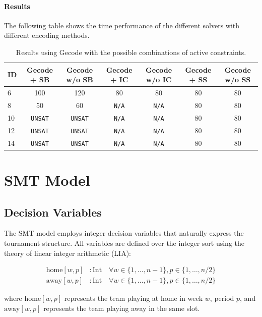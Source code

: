 \documentclass[11pt]{article}
\begin{document}
\paragraph{Results} The following table shows the time performance of the different solvers with different encoding methods.
\begin{table}[H]
\centering
\small
\label{tab:sat}
\begin{tabular}{@{}lcccccc@{}}
\toprule
ID & Gecode + SB & Gecode w/o SB & Gecode + IC & Gecode w/o IC & Gecode + SS & Gecode w/o SS \\
\midrule
6 & 100 & 120 & 80 & 80 & 80 & 80\\
8 & 50 & 60 & \texttt{N/A} & \texttt{N/A} & 80 & 80 \\
10 & \texttt{UNSAT} & \texttt{UNSAT} & \texttt{N/A} & \texttt{N/A} & 80 & 80\\
12 & \texttt{UNSAT} & \texttt{UNSAT} & \texttt{N/A} & \texttt{N/A} & 80 & 80\\
14 & \texttt{UNSAT} & \texttt{UNSAT} & \texttt{N/A} & \texttt{N/A} & 80 & 80\\
\bottomrule
\end{tabular}
\caption{Results using Gecode with the possible combinations of active constraints.}
\end{table}

\section{SMT Model}

\subsection{Decision Variables}

The SMT model employs integer decision variables that naturally express the tournament structure. All variables are defined over the integer sort using the theory of linear integer arithmetic (LIA):

\begin{align}
\text{home}[w,p] &: \text{Int} \quad \forall w \in \{1, \ldots, n-1\}, p \in \{1, \ldots, n/2\} \\
\text{away}[w,p] &: \text{Int} \quad \forall w \in \{1, \ldots, n-1\}, p \in \{1, \ldots, n/2\}
\end{align}

where $\text{home}[w,p]$ represents the team playing at home in week $w$, period $p$, and $\text{away}[w,p]$ represents the team playing away in the same slot.
\end{document}
